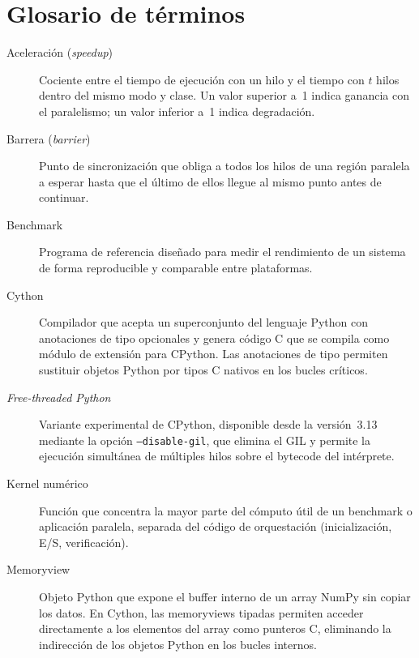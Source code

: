 \chapter{Glosario de términos}
\label{chap:glosario-terminos}

\begin{description}

  \item[Aceleración (\emph{speedup})] Cociente entre el tiempo de ejecución
        con un hilo y el tiempo con $t$ hilos dentro del mismo modo y clase.
        Un valor superior a~1 indica ganancia con el paralelismo; un valor
        inferior a~1 indica degradación.

  \item[Barrera (\emph{barrier})] Punto de sincronización que obliga a todos
        los hilos de una región paralela a esperar hasta que el último de
        ellos llegue al mismo punto antes de continuar.

  \item[Benchmark] Programa de referencia diseñado para medir el rendimiento
        de un sistema de forma reproducible y comparable entre plataformas.

  \item[Cython] Compilador que acepta un superconjunto del lenguaje Python
        con anotaciones de tipo opcionales y genera código C que se compila
        como módulo de extensión para CPython. Las anotaciones de tipo
        permiten sustituir objetos Python por tipos C nativos en los bucles
        críticos.

  \item[\emph{Free-threaded Python}] Variante experimental de CPython,
        disponible desde la versión~3.13 mediante la opción
        \texttt{--disable-gil}, que elimina el GIL y permite la ejecución
        simultánea de múltiples hilos sobre el bytecode del intérprete.

  \item[Kernel numérico] Función que concentra la mayor parte del cómputo
        útil de un benchmark o aplicación paralela, separada del código de
        orquestación (inicialización, E/S, verificación).

  \item[Memoryview] Objeto Python que expone el buffer interno de un array
        NumPy sin copiar los datos. En Cython, las memoryviews tipadas
        permiten acceder directamente a los elementos del array como punteros
        C, eliminando la indirección de los objetos Python en los bucles
        internos.


\end{description}
